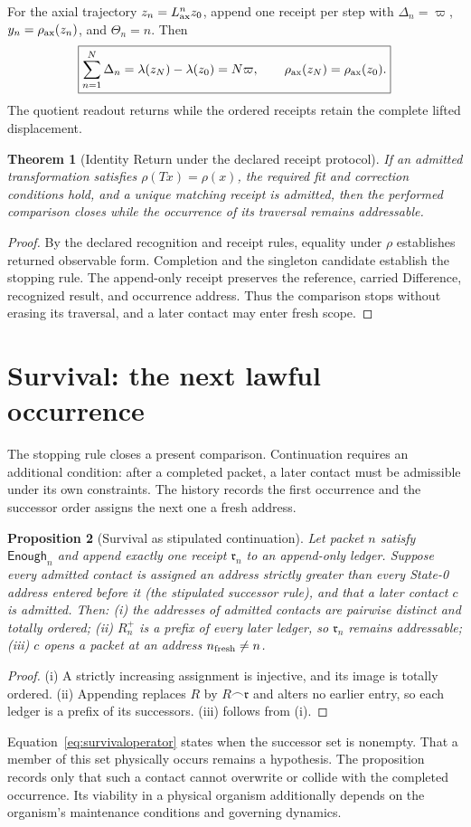 \documentclass[10pt]{article}
\newtheorem{theorem}{Theorem}
\newtheorem{proposition}[theorem]{Proposition}
\begin{document}
For the axial trajectory $z_n=L_{\rm ax}^{n}z_0$, append one receipt per step with $\Delta_n=\varpi$, $y_n=\rho_{\rm ax}(z_n)$, and $\Theta_n=n$. Then
\begin{equation}
\boxed{\sum_{n=1}^{N}\Delta_n
=\lambda(z_N)-\lambda(z_0)=N\varpi,\qquad
\rho_{\rm ax}(z_N)=\rho_{\rm ax}(z_0).}
\end{equation}
The quotient readout returns while the ordered receipts retain the complete lifted displacement.
\begin{theorem}[Identity Return under the declared receipt protocol] If an admitted transformation satisfies $\rho(Tx)=\rho(x)$, the required fit and correction conditions hold, and a unique matching receipt is admitted, then the performed comparison closes while the occurrence of its traversal remains addressable.\end{theorem}
\begin{proof}By the declared recognition and receipt rules, equality under $\rho$ establishes returned observable form. Completion and the singleton candidate establish the stopping rule. The append-only receipt preserves the reference, carried Difference, recognized result, and occurrence address. Thus the comparison stops without erasing its traversal, and a later contact may enter fresh scope.\end{proof}

\section{Survival: the next lawful occurrence}\label{sec:surv}
The stopping rule closes a present comparison. Continuation requires an additional condition: after a completed packet, a later contact must be admissible under its own constraints. The history records the first occurrence and the successor order assigns the next one a fresh address.
\begin{proposition}[Survival as stipulated continuation]
Let packet $n$ satisfy $\mathsf{Enough}_n$ and append exactly one receipt $\mathfrak r_n$ to an append-only ledger. Suppose every admitted contact is assigned an address strictly greater than every State-0 address entered before it (the stipulated successor rule), and that a later contact $c$ is admitted. Then: (i) the addresses of admitted contacts are pairwise distinct and totally ordered; (ii) $R_n^+$ is a prefix of every later ledger, so $\mathfrak r_n$ remains addressable; (iii) $c$ opens a packet at an address $n_{\rm fresh}\ne n$.
\end{proposition}
\begin{proof}
(i) A strictly increasing assignment is injective, and its image is totally ordered. (ii) Appending replaces $R$ by $R\frown\mathfrak r$ and alters no earlier entry, so each ledger is a prefix of its successors. (iii) follows from (i).
\end{proof}
Equation~\eqref{eq:survivaloperator} states when the successor set is nonempty. That a member of this set physically occurs remains a hypothesis. The proposition records only that such a contact cannot overwrite or collide with the completed occurrence. Its viability in a physical organism additionally depends on the organism's maintenance conditions and governing dynamics.
\end{document}
